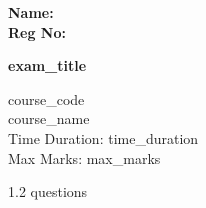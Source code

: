 \documentclass[a4paper,12pt]{article}
\begin{document}
\textbf{Name:} \underline{\hspace{10cm}} \\
\textbf{Reg No:} \underline{\hspace{10cm}} \\

\vspace{1em}
\begin{center}
\textbf{\Large {{ exam_title }}}

{{ course_code }} \\
{{ course_name }} \\
Time Duration: {{ time_duration }} \\
Max Marks: {{ max_marks }}
\end{center}

\vspace{1cm}

\begin{spacing}{1.2}
{{ questions }}
\end{spacing}
\end{document}
